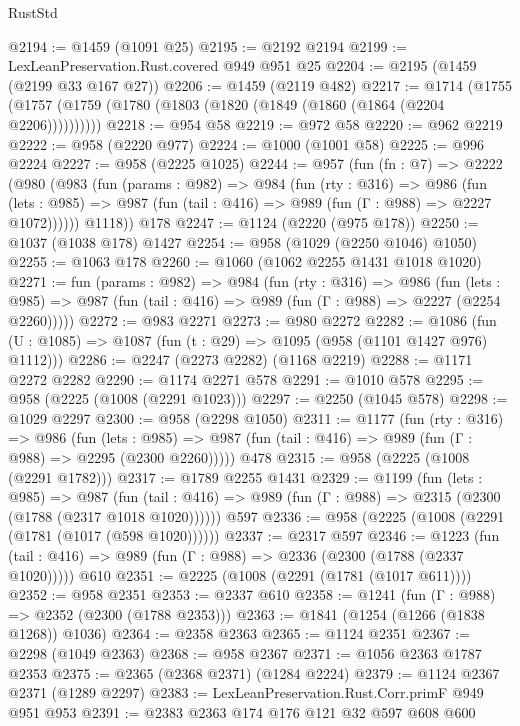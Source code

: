 \begin{lexlean}{RustStd}
\begin{coremodule}
@2194 := @1459 (@1091 @25)
@2195 := @2192 @2194
@2199 := LexLeanPreservation.Rust.covered @949 @951 @25
@2204 := @2195 (@1459 (@2199 @33 @167 @27))
@2206 := @1459 (@2119 @482)
@2217 := @1714 (@1755 (@1757 (@1759 (@1780 (@1803 (@1820 (@1849 (@1860 (@1864 (@2204 @2206))))))))))
@2218 := @954 @58
@2219 := @972 @58
@2220 := @962 @2219
@2222 := @958 (@2220 @977)
@2224 := @1000 (@1001 @58)
@2225 := @996 @2224
@2227 := @958 (@2225 @1025)
@2244 := @957
    (fun (fn : @7) =>
    @2222
      (@980
        (@983
          (fun (params : @982) =>
          @984
            (fun (rty : @316) =>
            @986
              (fun (lets : @985) =>
              @987 (fun (tail : @416) => @989 (fun (Γ : @988) => @2227 @1072))))))
        @1118))
    @178
@2247 := @1124 (@2220 (@975 @178))
@2250 := @1037 (@1038 @178) @1427
@2254 := @958 (@1029 (@2250 @1046) @1050)
@2255 := @1063 @178
@2260 := @1060 (@1062 @2255 @1431 @1018 @1020)
@2271 := fun (params : @982) =>
  @984
    (fun (rty : @316) =>
    @986
      (fun (lets : @985) =>
      @987 (fun (tail : @416) => @989 (fun (Γ : @988) => @2227 (@2254 @2260)))))
@2272 := @983 @2271
@2273 := @980 @2272
@2282 := @1086 (fun (U : @1085) => @1087 (fun (t : @29) => @1095 (@958 (@1101 @1427 @976) @1112)))
@2286 := @2247 (@2273 @2282) (@1168 @2219)
@2288 := @1171 @2272 @2282
@2290 := @1174 @2271 @578
@2291 := @1010 @578
@2295 := @958 (@2225 (@1008 (@2291 @1023)))
@2297 := @2250 (@1045 @578)
@2298 := @1029 @2297
@2300 := @958 (@2298 @1050)
@2311 := @1177
    (fun (rty : @316) =>
    @986
      (fun (lets : @985) =>
      @987 (fun (tail : @416) => @989 (fun (Γ : @988) => @2295 (@2300 @2260)))))
    @478
@2315 := @958 (@2225 (@1008 (@2291 @1782)))
@2317 := @1789 @2255 @1431
@2329 := @1199
    (fun (lets : @985) =>
    @987 (fun (tail : @416) => @989 (fun (Γ : @988) => @2315 (@2300 (@1788 (@2317 @1018 @1020))))))
    @597
@2336 := @958 (@2225 (@1008 (@2291 (@1781 (@1017 (@598 @1020))))))
@2337 := @2317 @597
@2346 := @1223
    (fun (tail : @416) => @989 (fun (Γ : @988) => @2336 (@2300 (@1788 (@2337 @1020)))))
    @610
@2351 := @2225 (@1008 (@2291 (@1781 (@1017 @611))))
@2352 := @958 @2351
@2353 := @2337 @610
@2358 := @1241 (fun (Γ : @988) => @2352 (@2300 (@1788 @2353)))
@2363 := @1841 (@1254 (@1266 (@1838 @1268)) @1036)
@2364 := @2358 @2363
@2365 := @1124 @2351
@2367 := @2298 (@1049 @2363)
@2368 := @958 @2367
@2371 := @1056 @2363 @1787 @2353
@2375 := @2365 (@2368 @2371) (@1284 @2224)
@2379 := @1124 @2367 @2371 (@1289 @2297)
@2383 := LexLeanPreservation.Rust.Corr.primF @949 @951 @953
@2391 := @2383 @2363 @174 @176 @121 @32 @597 @608 @600

\end{coremodule}
\end{lexlean}
